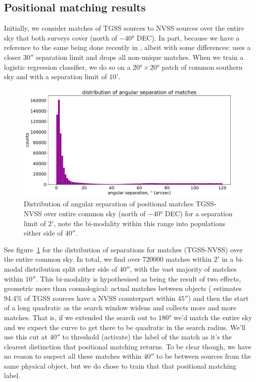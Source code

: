 \documentclass[12pt,a4paper]{article}
\begin{document}
\subsection{Positional matching results}
\label{sec:posmatch}

Initially, we consider matches of TGSS sources to NVSS sources over the entire sky that both surveys cover (north of $-\ang{40}$ DEC). In part, because we have a reference to the same being done recently in \citet{posmatchpaper}, albeit with some differences: \citet{posmatchpaper} uses a closer $\ang{;;30}$ separation limit and drops all non-unique matches. When we train a logistic regression classifier, we do so on a $\ang{20}\times\ang{20}$ patch of common southern sky and with a separation limit of $\ang{;10;}$.

\begin{figure}[H]
    \centering
    \includegraphics[width=\textwidth]{pics/hist_angle.pdf}
    \caption{Distribution of angular separation of positional matches TGSS-NVSS over entire common sky (north of $-\ang{40}$ DEC) for a separation limit of $\ang{;2;}$, note the bi-modality within this range into populations either side of $\ang{;;40}$.}
    \label{fig:hist_angle}
\end{figure}

See figure~\ref{fig:hist_angle} for the distribution of separations for matches (TGSS-NVSS) over the entire common sky. In total, we find over 720000 matches within $\ang{;2;}$ in a bi-modal distribution split either side of $\ang{;;40}$, with the vast majority of matches within $\ang{;;10}$. This bi-modality is hypothesised as being the result of two effects, geometric more than cosmological: actual matches between objects (\citet{tgss} estimates 94.4\% of TGSS sources have a NVSS counterpart within $\ang{;;45}$) and then the start of a long quadratic as the search window widens and collects more and more matches. That is, if we extended the search out to $\ang{180}$ we'd match the entire sky and we expect the curve to get there to be quadratic in the search radius. We'll use this cut at $\ang{;;40}$ to threshold (activate) the label of the match as it's the clearest distinction that positional matching returns. To be clear though, we have no reason to suspect all these matches within $\ang{;;40}$ to be between sources from the same physical object, but we do chose to train that that positional matching label.
\end{document}
